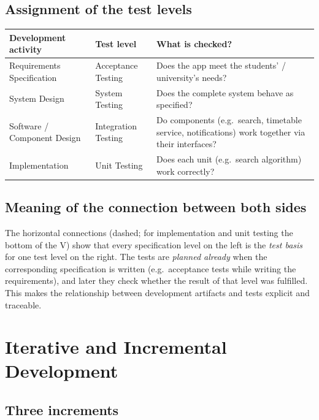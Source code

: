 \documentclass[11pt,a4paper]{article}
\begin{document}
\subsection*{Assignment of the test levels}

\begin{tabularx}{\textwidth}{@{}l l L@{}}
\toprule
\textbf{Development activity} & \textbf{Test level} & \textbf{What is checked?} \\
\midrule
Requirements Specification  & Acceptance Testing  & Does the app meet the
  students' / university's needs? \\
System Design               & System Testing      & Does the complete system
  behave as specified? \\
Software / Component Design & Integration Testing & Do components (e.g.\
  search, timetable service, notifications) work together via their
  interfaces? \\
Implementation              & Unit Testing        & Does each unit (e.g.\
  search algorithm) work correctly? \\
\bottomrule
\end{tabularx}

\subsection*{Meaning of the connection between both sides}

The horizontal connections (dashed; for implementation and unit testing the bottom of the V) show that every specification level on the
left is the \emph{test basis} for one test level on the right. The tests
are \emph{planned already} when the corresponding specification is
written (e.g.\ acceptance tests while writing the requirements), and later
they check whether the result of that level was fulfilled. This makes the
relationship between development artifacts and tests explicit and
traceable.

\section{Iterative and Incremental Development}

\subsection*{Three increments}
\end{document}
